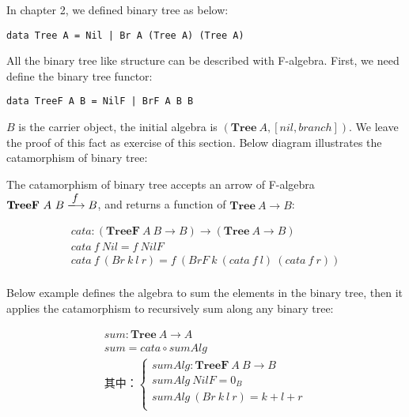 \documentclass{article}
\begin{document}
\begin{example}
\normalfont
In chapter 2, we defined binary tree as below:

\lstset{frame=none}
\begin{lstlisting}
data Tree A = Nil | Br A (Tree A) (Tree A)
\end{lstlisting}

All the binary tree like structure can be described with F-algebra. First, we need define the binary tree functor:

\begin{lstlisting}
data TreeF A B = NilF | BrF A B B
\end{lstlisting}

$B$ is the carrier object, the initial algebra is $(\mathbf{Tree}\ A, [nil, branch])$. We leave the proof of this fact as exercise of this section. Below diagram illustrates the catamorphism of binary tree:

\begin{center}
\end{center}

The catamorphism of binary tree accepts an arrow of F-algebra $\mathbf{TreeF}\ A\ B \arrowto{f} B$, and returns a function of $\mathbf{Tree}\ A \to B$:

\[
\begin{array}{l}
cata : (\mathbf{TreeF}\ A\ B \to B) \to (\mathbf{Tree}\ A \to B) \\
cata\ f\ Nil = f\ NilF \\
cata\ f\ (Br\ k\ l\ r) =f\ (BrF\ k\ (cata\ f\ l)\ (cata\ f\ r)) \\
\end{array}
\]

Below example defines the algebra to sum the elements in the binary tree, then it applies the catamorphism to recursively sum along any binary tree:

\[
\begin{array}{l}
sum : \mathbf{Tree}\ A \to A \\
sum = cata \circ sumAlg \\
\text{其中：}
      \begin{cases}
        sumAlg : \mathbf{TreeF}\ A\ B \to B \\
        sumAlg\ NilF = 0_{B} \\
        sumAlg\ (Br\ k\ l\ r) = k + l + r \\
      \end{cases} \\
\end{array}
\]


\end{example}
\end{document}
